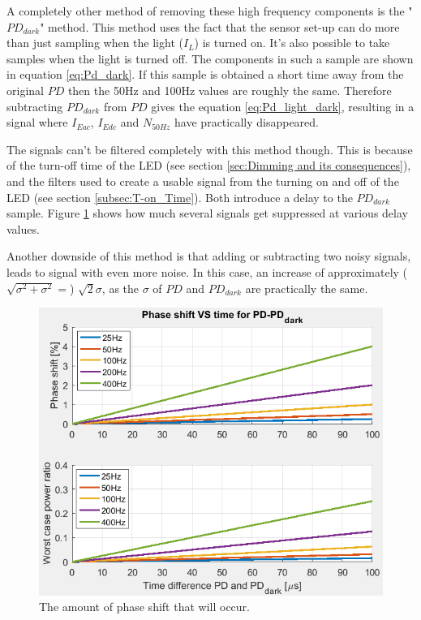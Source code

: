 A completely other method of removing these high frequency components is the "$PD_{dark}$" method. This method uses the fact that the sensor set-up can do more than just sampling when the light ($I_{L}$) is turned on. It's also possible to take samples when the light is turned off. The components in such a sample are shown in equation \ref{eq:Pd_dark}. If this sample is obtained a short time away from the original $PD$ then the 50Hz and 100Hz values are roughly the same. Therefore subtracting $PD_{dark}$ from $PD$ gives the equation \ref{eq:Pd_light_dark}, resulting in a signal where $I_{Eac}$, $I_{Edc}$ and $N_{50Hz}$ have practically disappeared.


The signals can't be filtered completely with this method though. This is because of the turn-off time of the LED (see section \ref{sec:Dimming and its consequences}), and the filters used to create a usable signal from the turning on and off of the LED (see section \ref{subsec:T-on_Time}). Both introduce a delay to the $PD_{dark}$ sample. Figure \ref{fig:Phaseshift} shows how much several signals get suppressed at various delay values.

Another downside of this method is that adding or subtracting two noisy signals, leads to signal with even more noise. In this case, an increase of approximately ($\sqrt{\sigma^2+\sigma^2} =$) $\sqrt{2} \sigma$\cite{@needref@}, as the $\sigma$ of $PD$ and $PD_{dark}$ are practically the same.

\begin{figure}
	\includegraphics[width=\textwidth]{pics/PasheshiftVStime.png}
	\caption{The amount of phase shift that will occur.}
	\label{fig:Phaseshift}
\end{figure}

